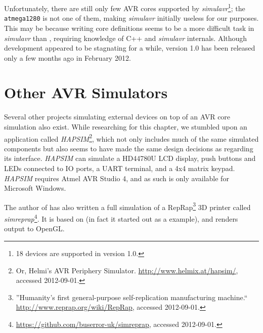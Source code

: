Unfortunately, there are still only few \ac{AVR} cores supported by \emph{simulavr}\footnote{
%
18 devices are supported in version 1.0.
%
}; the \verb|atmega1280| is not one of them, making \emph{simulavr}
initially useless for our purposes. This may be because writing core definitions
seems to be a more difficult task in \emph{simulavr} than \simavr, requiring
knowledge of C++ and \emph{simulavr} internals.
Although development appeared to be stagnating for a while, version 1.0 has been
released only a few months ago in February 2012.

\section{Other \acs{AVR} Simulators}

Several other projects simulating external devices on top of an \ac{AVR} core
simulation also exist. While researching for this chapter, we stumbled upon
an application called \emph{HAPSIM}\footnote{
%
Or, Helmi's \ac{AVR} Periphery Simulator. \url{http://www.helmix.at/hapsim/}, accessed 2012-09-01.
%
}, which not only includes much of the same simulated components but also
seems to have made the same design decisions as \qsimavr regarding its interface.
\emph{HAPSIM} can simulate a HD44780U LCD display, push buttons and \acp{LED}
connected to \ac{IO} ports, a \ac{UART} terminal, and a 4x4 matrix keypad.
\emph{HAPSIM} requires Atmel AVR Studio 4, and as such is only available for
Microsoft Windows.

The author of \simavr has also written a full simulation of a RepRap\footnote{
%
''Humanity's first general-purpose self-replication manufacturing machine.``
\url{http://www.reprap.org/wiki/RepRap}, accessed 2012-09-01.
%
} 3D printer called \emph{simreprap}\footnote{
%
\url{https://github.com/buserror-uk/simreprap}, accessed 2012-09-01.
%
}. It is based on \simavr (in fact it started out as a \simavr example),
and renders output to \ac{OpenGL}.
